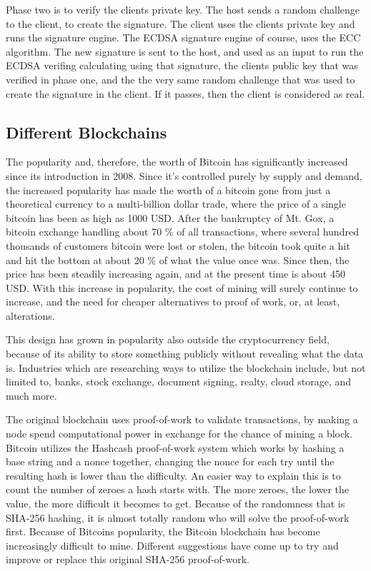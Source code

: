\documentclass[11pt]{article}
\begin{document}
Phase two is to verify the clients private key. The host sends a random challenge to the client, to create the signature. The client uses the clients private key and runs the signature engine. The ECDSA signature engine of course, uses the ECC algorithm. The new signature is sent to the host, and used as an input to run the ECDSA verifing calculating using that signature, the clients public key that was verified in phase one, and the the very same random challenge that was used to create the signature in the client. If it passes, then the client is considered as real. 

\subsection{Different Blockchains}

The popularity and, therefore, the worth of Bitcoin has significantly increased since its introduction in 2008. Since it's controlled purely by supply and demand, the increased popularity has made the worth of a bitcoin gone from just a theoretical currency to a multi-billion dollar trade, where the price of a single bitcoin has been as high as 1000 USD. After the bankruptcy of Mt. Gox, a bitcoin exchange handling about 70 \% of all transactions, where several hundred thousands of customers bitcoin were lost or stolen, the bitcoin took quite a hit and hit the bottom at about 20 \% of what the value once was. Since then, the price has been steadily increasing again, and at the present time is about 450 USD. With this increase in popularity, the cost of mining will surely continue to increase, and the need for cheaper alternatives to proof of work, or, at least, alterations.  

This design has grown in popularity also outside the cryptocurrency field, because of its ability to store something publicly without revealing what the data is. Industries which are researching ways to utilize the blockchain include, but not limited to, banks, stock exchange, document signing, realty, cloud storage, and much more. 

The original blockchain uses proof-of-work to validate transactions, by making a node spend computational power in exchange for the chance of mining a block. Bitcoin utilizes the Hashcash\cite{hashcash} proof-of-work system which works by hashing a base string and a nonce together, changing the nonce for each try until the resulting hash is lower than the difficulty. An easier way to explain this is to count the number of zeroes a hash starts with. The more zeroes, the lower the value, the more difficult it becomes to get. Because of the randomness that is SHA-256 hashing, it is almost totally random who will solve the proof-of-work first. Because of Bitcoins popularity, the Bitcoin blockchain has become increasingly difficult to mine. Different suggestions have come up to try and improve or replace this original SHA-256 proof-of-work. 
\end{document}
